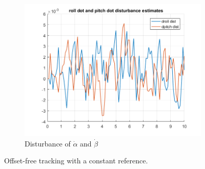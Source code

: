 \documentclass[11pt]{article}
\begin{document}
\begin{enumerate}
\begin{figure}[ht]
\begin{subfigure}[c]{0.3\linewidth}
            \includegraphics[width=\linewidth]{Plots_09_OffsetFreeTracking_Constant/10}
            \caption{Disturbance of $\dot{\alpha}$ and $\dot{\beta}$}
        \end{subfigure}
        \caption{Offset-free tracking with a constant reference.}
        \label{fig:offset_free_tracking_with_constant}
\end{figure}


\end{enumerate}
\end{document}

